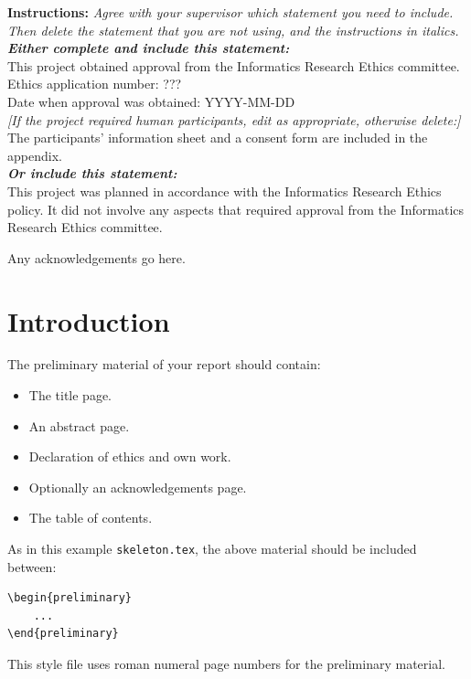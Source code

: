 \documentclass[logo,bsc,singlespacing,parskip,online]{infthesis}
\begin{document}
\begin{preliminary}
\begin{ethics}
\textbf{Instructions:} \emph{Agree with your supervisor which
statement you need to include. Then delete the statement that you are not using,
and the instructions in italics.\\
\textbf{Either complete and include this statement:}}\\ %
%
This project obtained approval from the Informatics Research Ethics committee.\\
Ethics application number: ???\\
Date when approval was obtained: YYYY-MM-DD\\
%
\emph{[If the project required human participants, edit as appropriate, otherwise delete:]}\\ %
The participants' information sheet and a consent form are included in the appendix.\\
%
\textbf{\emph{Or include this statement:}}\\ %
This project was planned in accordance with the Informatics Research
Ethics policy. It did not involve any aspects that required approval
from the Informatics Research Ethics committee.

\standarddeclaration
\end{ethics}


\begin{acknowledgements}
Any acknowledgements go here.
\end{acknowledgements}


\tableofcontents
\end{preliminary}


\chapter{Introduction}

The preliminary material of your report should contain:
\begin{itemize}
\item
The title page.
\item
An abstract page.
\item
Declaration of ethics and own work.
\item
Optionally an acknowledgements page.
\item
The table of contents.
\end{itemize}

As in this example \texttt{skeleton.tex}, the above material should be
included between:
\begin{verbatim}
\begin{preliminary}
    ...
\end{preliminary}
\end{verbatim}
This style file uses roman numeral page numbers for the preliminary material.
\end{document}
